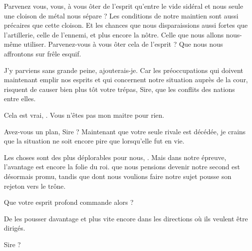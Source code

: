 \begin{drama}
  Parvenez vous, vous, à vous ôter de l’esprit qu’entre le vide sidéral et nous seule une cloison de métal nous sépare ? Les conditions de notre maintien sont aussi précaires que cette cloison. Et les chances que nous disparaissions aussi fortes que l’artillerie, celle de l’ennemi, et plus encore la nôtre. Celle que nous allons nous-même utiliser. Parvenez-vous à vous ôter cela de l’esprit ? Que nous nous affrontons sur frêle esquif.

  \alexasspeaks J’y parviens sans grande peine,  ajouterais-je. Car les préoccupations qui doivent maintenant emplir nos esprits et qui concernent notre situation auprès de la cour, risquent de causer bien plus tôt votre trépas, Sire, que les conflits des nations entre elles.

  \elenaspeaks Cela est vrai, \alexas. Vous n’êtes pas mon maitre pour rien.

  \alexasspeaks Avez-vous un plan, Sire ? Maintenant que votre seule rivale est décédée, je crains que la situation ne soit encore pire que lorsqu’elle fut en vie.

  \elenaspeaks Les choses sont des plus déplorables pour nous, \alexas. Mais dans notre épreuve, l’avantage est encore la folie du roi. \general{} que nous pensions devenir notre second est désormais promu, tandis que \reine{} dont nous voulions faire notre sujet pousse son rejeton vers le trône.

  \alexasspeaks Que votre esprit profond commande alors ?

  \elenaspeaks De les pousser davantage et plus vite encore dans les directions où ils veulent être dirigés.


  \alexasspeaks {} Sire ?
\end{drama}


\scene

\StageDirII{\elena, \general}


